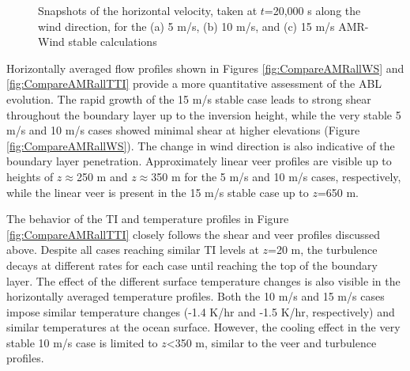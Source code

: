 \begin{figure}[hbt!]
  \caption{ \label{fig:SnapshotsSide} Snapshots of the horizontal
    velocity, taken at $t$=20,000 s along the wind direction, for
    the (a) 5 m/s, (b) 10 m/s, and (c) 15 m/s AMR-Wind stable
    calculations }

\end{figure}

Horizontally averaged flow profiles shown in Figures
\ref{fig:CompareAMRallWS} and \ref{fig:CompareAMRallTTI} provide a
more quantitative assessment of the ABL evolution.  The rapid growth
of the 15 m/s stable case leads to strong shear throughout the
boundary layer up to the inversion height, while the very stable 5 m/s
and 10 m/s cases showed minimal shear at higher elevations (Figure \ref{fig:CompareAMRallWS}).  The
change in wind direction is also indicative of the boundary layer
penetration.  Approximately linear veer profiles are visible up to
heights of $z\approx$250 m and $z\approx$350 m for the 5 m/s and 10
m/s cases, respectively, while the linear veer is present in the 15
m/s stable case up to $z$=650 m.

The behavior of the TI and temperature profiles in Figure
\ref{fig:CompareAMRallTTI} closely follows the shear and veer profiles
discussed above.  Despite all cases reaching similar TI levels at
$z$=20 m, the turbulence decays at different rates for each case until
reaching the top of the boundary layer.  The effect of the different
surface temperature changes is also visible in the horizontally
averaged temperature profiles.  Both the 10 m/s and 15 m/s cases impose
similar temperature changes (-1.4 K/hr and -1.5 K/hr, respectively)
and similar temperatures at the ocean surface.  However, the
cooling effect in the very stable 10 m/s case is limited to $z$<350
m, similar to the veer and turbulence profiles.

